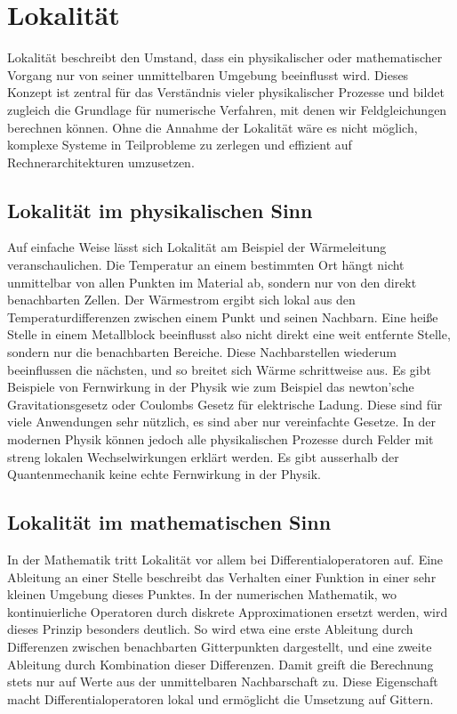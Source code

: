 %
%
%
%
\section{Lokalität
\label{parallelisierung:sec:Lokalitaet}}
Lokalität beschreibt den Umstand, dass ein physikalischer oder mathematischer Vorgang nur von seiner unmittelbaren Umgebung beeinflusst wird. 
Dieses Konzept ist zentral für das Verständnis vieler physikalischer Prozesse und bildet zugleich die Grundlage für numerische Verfahren, mit denen wir Feldgleichungen berechnen können. 
Ohne die Annahme der Lokalität wäre es nicht möglich, komplexe Systeme in Teilprobleme zu zerlegen und effizient auf Rechnerarchitekturen umzusetzen.

\subsection{Lokalität im physikalischen Sinn
	\label{parallelisierung:sub:LokalitaetPhysik}}
Auf einfache Weise lässt sich Lokalität am Beispiel der Wärmeleitung veranschaulichen. 
Die Temperatur an einem bestimmten Ort hängt nicht unmittelbar von allen Punkten im Material ab, sondern nur von den direkt benachbarten Zellen. 
Der Wärmestrom ergibt sich lokal aus den Temperaturdifferenzen zwischen einem Punkt und seinen Nachbarn.
Eine heiße Stelle in einem Metallblock beeinflusst also nicht direkt eine weit entfernte Stelle, sondern nur die benachbarten Bereiche. 
Diese Nachbarstellen wiederum beeinflussen die nächsten, und so breitet sich Wärme schrittweise aus. 
Es gibt Beispiele von Fernwirkung in der Physik wie zum Beispiel das newton'sche Gravitationsgesetz oder Coulombs Gesetz für elektrische Ladung.
Diese sind für viele Anwendungen sehr nützlich, es sind aber nur vereinfachte Gesetze.
In der modernen Physik können jedoch alle physikalischen Prozesse durch Felder mit streng lokalen Wechselwirkungen erklärt werden.
Es gibt ausserhalb der Quantenmechanik keine echte Fernwirkung in der Physik.

\subsection{Lokalität im mathematischen Sinn
\label{parallelisierung:sub:LokalitaetMathematik}}
In der Mathematik tritt Lokalität vor allem bei Differentialoperatoren auf. 
Eine Ableitung an einer Stelle beschreibt das Verhalten einer Funktion in einer sehr kleinen Umgebung dieses Punktes. 
In der numerischen Mathematik, wo kontinuierliche Operatoren durch diskrete Approximationen ersetzt werden, wird dieses Prinzip besonders deutlich. 
So wird etwa eine erste Ableitung durch Differenzen zwischen benachbarten Gitterpunkten dargestellt, und eine zweite Ableitung durch Kombination dieser Differenzen. 
Damit greift die Berechnung stets nur auf Werte aus der unmittelbaren Nachbarschaft zu. 
Diese Eigenschaft macht Differentialoperatoren lokal und ermöglicht die Umsetzung auf Gittern.

